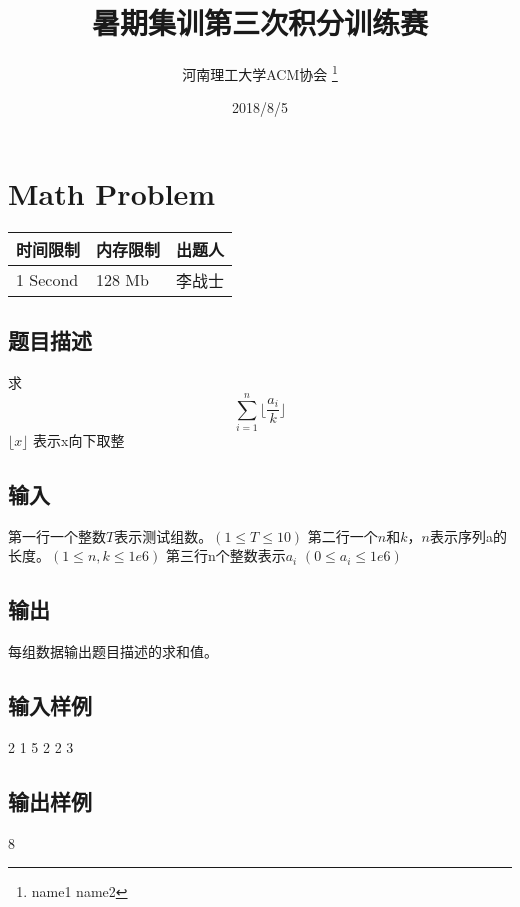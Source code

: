 \documentclass[12pt, a4paper]{article}
\title{暑期集训第三次积分训练赛}
\author{河南理工大学ACM协会 \thanks{name1 name2}}
\date{2018/8/5}
\begin{document}
\maketitle\newpage


\section{Math Problem}

\begin{table}[!h]
  \centering
  \begin{tabular}{l|l|l}
  时间限制 & 内存限制 & 出题人 \\
  \hline
  1 Second & 128 Mb & 李战士 \\
\end{tabular}
\end{table}

\subsection*{题目描述}
求
$$ \sum_{i=1}^n \lfloor \frac {a_i}{k} \rfloor $$
\newline $\lfloor x \rfloor$ 表示x向下取整
\subsection*{输入}
第一行一个整数$T$表示测试组数。$(1 \leq T \leq 10)$\newline
第二行一个$n$和$k$，$n$表示序列a的长度。$( 1 \leq n ,k\leq 1e6)$\newline
第三行n个整数表示$a_i$  $( 0 \leq a_i \leq 1e6)$
\subsection*{输出}
每组数据输出题目描述的求和值。
\subsection*{输入样例}
2  1  5   2  2 3
\subsection*{输出样例}
8 
 
\end{document}
